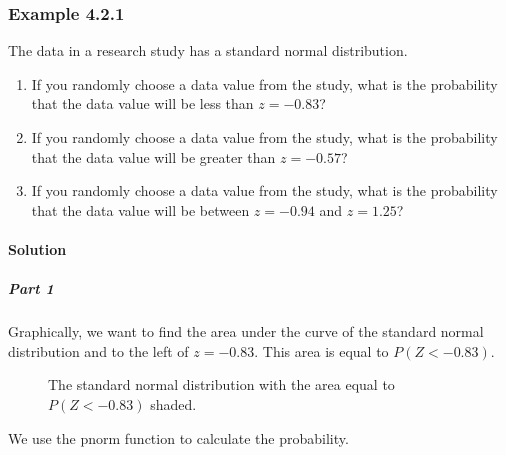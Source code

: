 \documentclass[letterpaper,10pt,english]{jupyterBook}
\begin{document}
\subsubsection{Example 4.2.1}
\label{\detokenize{Ch4 The Normal Distribution and the Central Limit Theorem/4.2 The Standard Normal Distribution:example-4-2-1}}
\sphinxAtStartPar
The data in a research study has a standard normal distribution.
\begin{enumerate}
%
\item {} 
\sphinxAtStartPar
If you randomly choose a data value from the study, what is the probability that the data value will be less than \(z = -0.83\)?

\item {} 
\sphinxAtStartPar
If you randomly choose a data value from the study, what is the probability that the data value will be greater than \(z = -0.57\)?

\item {} 
\sphinxAtStartPar
If you randomly choose a data value from the study, what is the probability that the data value will be between \(z = -0.94\) and \(z = 1.25\)?

\end{enumerate}


\paragraph{Solution}
\label{\detokenize{Ch4 The Normal Distribution and the Central Limit Theorem/4.2 The Standard Normal Distribution:solution}}

\subparagraph{Part 1}
\label{\detokenize{Ch4 The Normal Distribution and the Central Limit Theorem/4.2 The Standard Normal Distribution:part-1}}
\sphinxAtStartPar
Graphically, we want to find the area under the curve of the standard normal distribution and to the left of \(z = -0.83\). This area is equal to \(P(Z < -0.83)\).

\begin{figure}[htbp]
\centering
\capstart

\noindent{}
\caption{The standard normal distribution with the area equal to \(P(Z < -0.83)\) shaded.}\label{\detokenize{Ch4 The Normal Distribution and the Central Limit Theorem/4.2 The Standard Normal Distribution:stdnormal-ex1}}\end{figure}

\sphinxAtStartPar
We use the pnorm function to calculate the probability.
\end{document}
